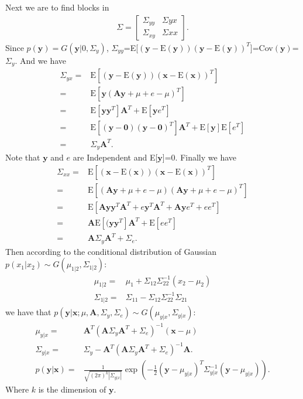 \documentclass[12pt,a4paper,UTF8,fntef]{article}
\begin{document}
Next we are to find blocks in 
\begin{align*}
	\Sigma=\begin{bmatrix}
		\Sigma_{yy} & \Sigma{yx} \\ 
		\Sigma_{xy} & \Sigma{xx}
	\end{bmatrix}.
\end{align*}
Since $p(\mathbf{y})=G(\mathbf{y}|0,\Sigma_y)$, $\Sigma_{yy}$=E[$(\mathbf{y}-\text{E}(\mathbf{y}))(\mathbf{y}-\text{E}(\mathbf{y}))^T$]=Cov$(\mathbf{y})$=$\Sigma_y$. And we have 
\begin{align*}
	\Sigma_{yx}=&\text{E}[(\mathbf{y}-\text{E}(\mathbf{y}))(\mathbf{x}-\text{E}(\mathbf{x}))^T]\\
	=&\text{E}[\mathbf{y}(\mathbf{Ay}+\mu+e-\mu)^T]\\
	=&\text{E}[\mathbf{y}\mathbf{y}^T]\mathbf{A}^T+\text{E}[\mathbf{y}e^T]\\
	=&\text{E}[(\mathbf{y-0})(\mathbf{y-0})^T]\mathbf{A}^T+\text{E}[\mathbf{y}]\text{E}[e^T]\\
	=&\Sigma_{y}\mathbf{A}^T.
\end{align*}
Note that $\mathbf{y}$ and $e$ are Independent and E[$\mathbf{y}$]=0. Finally we have 
\begin{align*}
	\Sigma_{xx}=&\text{E}[(\mathbf{x}-\text{E}(\mathbf{x}))(\mathbf{x}-\text{E}(\mathbf{x}))^T]\\
	=&\text{E}[(\mathbf{Ay}+\mu+e-\mu)(\mathbf{Ay}+\mu+e-\mu)^T]\\
	=&\text{E}[\mathbf{A}\mathbf{y}\mathbf{y}^T\mathbf{A}^T+e\mathbf{y}^T\mathbf{A}^T+\mathbf{A}\mathbf{y}e^T+ee^T]\\
	=&\mathbf{A}\text{E}[(\mathbf{y}\mathbf{y}^T]\mathbf{A}^T+\text{E}[ee^T]\\
	=&\mathbf{A}\Sigma_{y}\mathbf{A}^T+\Sigma_e.
\end{align*}
Then according to the conditional distribution of Gaussian $p(x_1|x_2)\sim G(\mu_{1|2},\Sigma_{1|2})$:
\begin{align*}
	\mu_{1|2}=&\mu_1+\Sigma_{12}\Sigma_{22}^{-1}(x_2-\mu_2)\\
	\Sigma_{1|2}=&\Sigma_{11}-\Sigma_{12}\Sigma_{22}^{-1}\Sigma_{21}
\end{align*}
we have that $p(\mathbf{y}|\mathbf{x};\mu,\mathbf{A},\Sigma_y,\Sigma_e)\sim G(\mu_{y|x},\Sigma_{y|x})$:
\begin{align*}
	\mu_{y|x}=&\mathbf{A}^T(\mathbf{A}\Sigma_{y}\mathbf{A}^T+\Sigma_e)^{-1}(\mathbf{x}-\mu)\\
	\Sigma_{y|x}=&\Sigma_y-\mathbf{A}^T(\mathbf{A}\Sigma_{y}\mathbf{A}^T+\Sigma_e)^{-1}\mathbf{A}.\\
	p(\mathbf{y}|\mathbf{x})=&\frac{1}{\sqrt{(2\pi)^k|\Sigma_{y|x}|}}\exp\left(-\frac{1}{2}(\mathbf{y}-\mu_{y|x})^T\Sigma_{y|x}^{-1}(\mathbf{y}-\mu_{y|x})\right).
\end{align*}
Where $k$ is the dimension of $\mathbf{y}$. 
\end{document}

